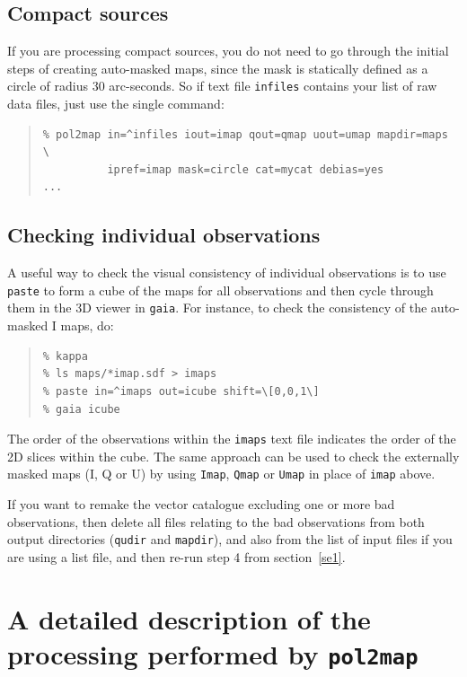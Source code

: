 \documentclass[twoside,11pt]{starlink}
\begin{document}
\subsection{Compact sources}
If you are processing compact sources, you do not need to go through the
initial steps of creating auto-masked maps, since the mask is statically
defined as a circle of radius 30 arc-seconds. So if text file
\texttt{infiles} contains your list of raw data files, just use the
single command:

\begin{quote}
\begin{verbatim}
% pol2map in=^infiles iout=imap qout=qmap uout=umap mapdir=maps \
          ipref=imap mask=circle cat=mycat debias=yes
...
\end{verbatim}
\end{quote}

\subsection{Checking individual observations}
A useful way to check the visual consistency of individual observations
is to use \texttt{paste} to form a cube of the maps for all observations and
then cycle through
them in the 3D viewer in \texttt{gaia}. For instance, to check the
consistency of the auto-masked I maps, do:

\begin{quote}
\begin{verbatim}
% kappa
% ls maps/*imap.sdf > imaps
% paste in=^imaps out=icube shift=\[0,0,1\]
% gaia icube
\end{verbatim}
\end{quote}

The order of the observations within the \texttt{imaps} text file
indicates the order of the 2D slices within the cube. The same approach
can be used to check the externally masked maps (I, Q or U) by using
\texttt{Imap}, \texttt{Qmap} or \texttt{Umap} in place of \texttt{imap}
above.

If you want to remake the vector catalogue excluding one or more bad
observations, then delete all files relating to the bad observations from
both output directories (\texttt{qudir} and \texttt{mapdir}), and also
from the list of input files if you are using a list file, and then
re-run step 4 from section~\ref{se1}.

\section{A detailed description of the processing performed by \texttt{pol2map}}
\end{document}
